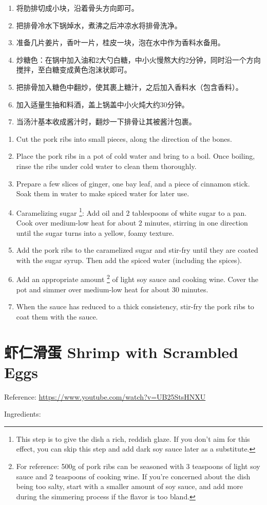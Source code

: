 \documentclass{article}
\newcommand{\chn}[1]{\foreignlanguage{chinese-simplified}{#1}}
\begin{document}
\begin{paracol}{2}
    \begin{enumerate}
        \item \foreignlanguage{chinese-simplified}{将肋排切成小块，沿着骨头方向即可。}
        \item \chn{把排骨冷水下锅焯水，煮沸之后冲凉水将排骨洗净。}
        \item \chn{准备几片姜片，香叶一片，桂皮一块，泡在水中作为香料水备用。}
        \item \chn{炒糖色：在锅中加入油和2大勺白糖，中小火慢熬大约2分钟，同时沿一个方向搅拌，至白糖变成黄色泡沫状即可。}
        \item \chn{把排骨加入糖色中翻炒，使其裹上糖汁，之后加入香料水（包含香料）。}
        \item \chn{加入适量生抽和料酒，盖上锅盖中小火炖大约30分钟。}
        \item \chn{当汤汁基本收成酱汁时，翻炒一下排骨让其被酱汁包裹。}
    \end{enumerate}
    
    \switchcolumn
    \begin{enumerate}
        \item Cut the pork ribs into small pieces, along the direction of the bones.
        \item Place the pork ribs in a pot of cold water and bring to a boil. 
        Once boiling, rinse the ribs under cold water to clean them thoroughly.
        \item Prepare a few slices of ginger, one bay leaf, and a piece of cinnamon stick. 
        Soak them in water to make spiced water for later use.
        \item Caramelizing sugar \footnote{This step is to give the dish a rich, reddish glaze. If you don't aim for this effect, you can skip this step and add dark soy sauce later as a substitute.}: 
        Add oil and 2 tablespoons of white sugar to a pan. 
        Cook over medium-low heat for about 2 minutes, stirring in one direction until the sugar turns into a yellow, foamy texture.
        \item Add the pork ribs to the caramelized sugar and stir-fry until they are coated with the sugar syrup. 
        Then add the spiced water (including the spices).
        \item Add an appropriate amount
        \footnote{For reference: 500g of pork ribs can be seasoned with 3 teaspoons of light soy sauce and 2 teaspoons of cooking wine. 
        If you're concerned about the dish being too salty, start with a smaller amount of soy sauce, and add more during the simmering process if the flavor is too bland.} 
        of light soy sauce and cooking wine. 
        Cover the pot and simmer over medium-low heat for about 30 minutes.
        \item When the sauce has reduced to a thick consistency, stir-fry the pork ribs to coat them with the sauce.
    \end{enumerate}
\end{paracol}
\section{\chn{虾仁滑蛋} Shrimp with Scrambled Eggs}
Reference: \url{https://www.youtube.com/watch?v=UB25StsHNXU}

Ingredients: 
\end{document}
